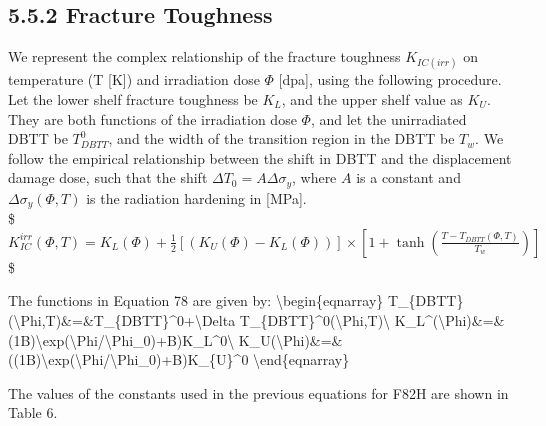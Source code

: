 \documentclass[letterpaper,10pt,english]{jupyterBook}
\begin{document}
	
	\subsection{5.5.2 Fracture Toughness}
	\label{\detokenize{5 Radiation Effects on Mechanical Properties:fracture-toughness}}
	\sphinxAtStartPar
	We represent the complex relationship of the fracture toughness \(K_{IC(irr)}\) on temperature (T {[}K{]}) and irradiation dose \(\Phi\) {[}dpa{]}, using the following procedure. Let the lower shelf fracture toughness be \(K_L\), and the upper shelf value as \(K_U\). They are both functions of the irradiation dose \(\Phi\), and let the unirradiated DBTT be \(T_{DBTT}^0\), and the width of the transition region in the DBTT be \(T_w\).  We follow the empirical relationship between the shift in DBTT and the displacement damage dose, such that the shift \(\Delta T_0=A\Delta \sigma_y\), where \(A\) is a constant and \(\Delta \sigma_y(\Phi,T)\) is the radiation hardening in {[}MPa{]}.\\
	\$\( K_{IC}^{irr}(\Phi,T)=K_L(\Phi)+\frac{1}{2}\left[(K_U(\Phi)-K_L(\Phi))\right]
	\times\left[1+\tanh\left(\frac{T-T_{DBTT}(\Phi,T)}{T_w} \right) \right] \)\$
	
	
	
	\sphinxAtStartPar
	The functions in Equation 78 are given by:
	\textbackslash{}begin\{eqnarray\}
	T\_\{DBTT\}(\textbackslash{}Phi,T)\&=\&T\_\{DBTT\}\textasciicircum{}0+\textbackslash{}Delta T\_\{DBTT\}\textasciicircum{}0(\textbackslash{}Phi,T)\textbackslash{}
	K\_L\textasciicircum{}(\textbackslash{}Phi)\&=\&(1\sphinxhyphen{}B)\textbackslash{}exp(\sphinxhyphen{}\textbackslash{}Phi/\textbackslash{}Phi\_0)+B)K\_L\textasciicircum{}0\textbackslash{}
	K\_U(\textbackslash{}Phi)\&=\&((1\sphinxhyphen{}B)\textbackslash{}exp(\sphinxhyphen{}\textbackslash{}Phi/\textbackslash{}Phi\_0)+B)K\_\{U\}\textasciicircum{}0
	\textbackslash{}end\{eqnarray\}
	
	\sphinxAtStartPar
	The values of the constants used in the previous equations for F82H are shown in Table 6.
	
\end{document}
